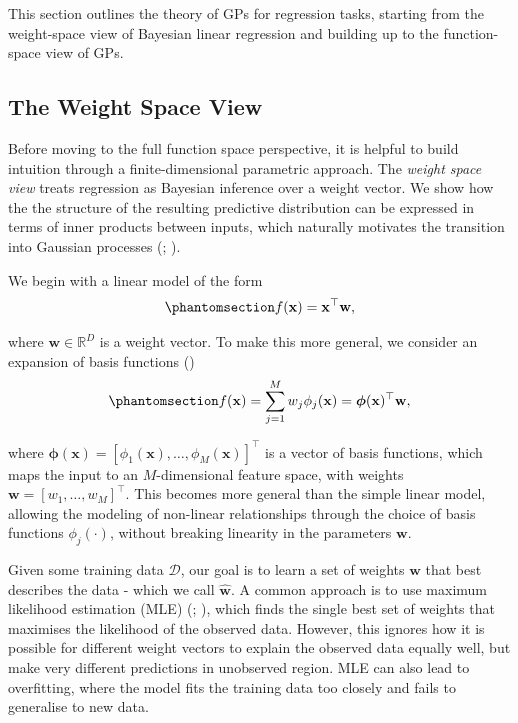 \documentclass[
  letterpaper,
  DIV=11,
  numbers=noendperiod]{scrartcl}
\begin{document}
This section outlines the theory of GPs for regression tasks, starting
from the weight-space view of Bayesian linear regression and building up
to the function-space view of GPs.

\subsection{The Weight Space View}\label{the-weight-space-view}

Before moving to the full function space perspective, it is helpful to
build intuition through a finite-dimensional parametric approach. The
\emph{weight space view} treats regression as Bayesian inference over a
weight vector. We show how the the structure of the resulting predictive
distribution can be expressed in terms of inner products between inputs,
which naturally motivates the transition into Gaussian processes
(;
).

We begin with a linear model of the form
\begin{equation}\phantomsection\label{eq-linear-model}{
f(\mathbf{x}) = \mathbf{x}^\top \mathbf{w},
}\end{equation}

where \(\mathbf{w} \in \mathbb{R}^D\) is a weight vector. To make this
more general, we consider an expansion of basis functions
()
\begin{equation}\phantomsection\label{eq-basis-expansion}{
f(\mathbf{x}) = \sum_{j=1}^{M} w_j \phi_j(\mathbf{x}) = \boldsymbol{\phi}(\mathbf{x})^\top \mathbf{w},
}\end{equation}

where
\(\boldsymbol{\phi}(\mathbf{x}) = [\phi_1(\mathbf{x}), \ldots, \phi_M(\mathbf{x})]^\top\)
is a vector of basis functions, which maps the input to an
\(M\)-dimensional feature space, with weights
\(\mathbf{w} = [w_1, \ldots, w_M]^\top\). This becomes more general than
the simple linear model, allowing the modeling of non-linear
relationships through the choice of basis functions \(\phi_j(\cdot)\),
without breaking linearity in the parameters \(\mathbf{w}\).

Given some training data \(\mathcal{D}\), our goal is to learn a set of
weights \(\mathbf{w}\) that best describes the data - which we call
\(\hat{\mathbf{w}}\). A common approach is to use maximum likelihood
estimation (MLE) (;
), which finds the single
best set of weights that maximises the likelihood of the observed data.
However, this ignores how it is possible for different weight vectors to
explain the observed data equally well, but make very different
predictions in unobserved region. MLE can also lead to overfitting,
where the model fits the training data too closely and fails to
generalise to new data.
\end{document}
